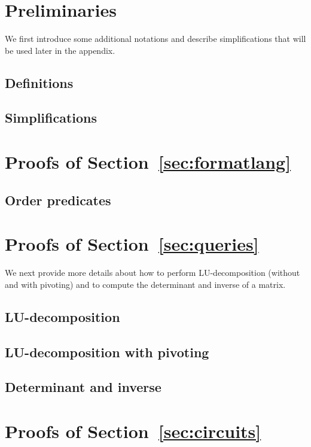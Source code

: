 \section{Preliminaries}
We first introduce some additional notations and describe simplifications that will be used later in the appendix.
\subsection{Definitions}
\label{app:def}

\subsection{Simplifications}\label{app:simp}



\section{Proofs of Section~\ref{sec:formatlang}}

\subsection{Order predicates}\label{app:order}



\section{Proofs of Section~\ref{sec:queries}}
We next provide more details about how to perform LU-decomposition (without and with pivoting)
and to compute the determinant and inverse of a matrix.
\subsection{LU-decomposition}


\subsection{LU-decomposition with pivoting}


\subsection{Determinant and inverse}\label{app:inverse}



\section{Proofs of Section~\ref{sec:circuits}}

